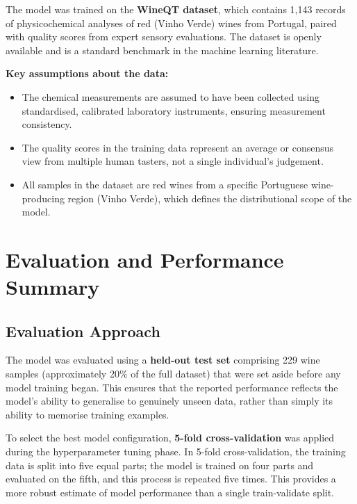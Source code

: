 \documentclass[11pt,a4paper]{article}
\begin{document}
The model was trained on the \textbf{WineQT dataset}, which contains 1,143 records of physicochemical analyses of red (Vinho Verde) wines from Portugal, paired with quality scores from expert sensory evaluations. The dataset is openly available and is a standard benchmark in the machine learning literature.

\textbf{Key assumptions about the data:}
\begin{itemize}[leftmargin=*]
    \item The chemical measurements are assumed to have been collected using standardised, calibrated laboratory instruments, ensuring measurement consistency.
    \item The quality scores in the training data represent an average or consensus view from multiple human tasters, not a single individual's judgement.
    \item All samples in the dataset are red wines from a specific Portuguese wine-producing region (Vinho Verde), which defines the distributional scope of the model.
\end{itemize}

\section{Evaluation and Performance Summary}
\label{sec:evaluation}

\subsection{Evaluation Approach}

The model was evaluated using a \textbf{held-out test set} comprising 229 wine samples (approximately 20\% of the full dataset) that were set aside before any model training began. This ensures that the reported performance reflects the model's ability to generalise to genuinely unseen data, rather than simply its ability to memorise training examples.

To select the best model configuration, \textbf{5-fold cross-validation} was applied during the hyperparameter tuning phase. In 5-fold cross-validation, the training data is split into five equal parts; the model is trained on four parts and evaluated on the fifth, and this process is repeated five times. This provides a more robust estimate of model performance than a single train-validate split.
\end{document}
